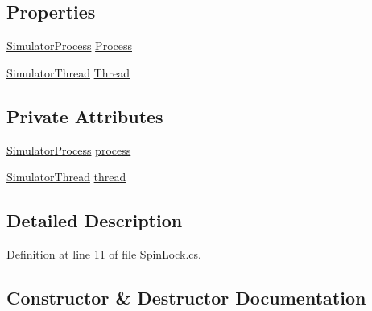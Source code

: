 \subsection*{Properties}
\begin{DoxyCompactItemize}
\item 
\hyperlink{class_c_p_u___o_s___simulator_1_1_operating___system_1_1_simulator_process}{Simulator\+Process} \hyperlink{class_c_p_u___o_s___simulator_1_1_operating___system_1_1_threading_1_1_spin_lock_a4237b6dc28a141c97ff1e03e96f11e22}{Process}
\item 
\hyperlink{class_c_p_u___o_s___simulator_1_1_operating___system_1_1_threading_1_1_simulator_thread}{Simulator\+Thread} \hyperlink{class_c_p_u___o_s___simulator_1_1_operating___system_1_1_threading_1_1_spin_lock_a1e950dc0372acfa9f7c9cd625a0f1417}{Thread}
\end{DoxyCompactItemize}
\subsection*{Private Attributes}
\begin{DoxyCompactItemize}
\item 
\hyperlink{class_c_p_u___o_s___simulator_1_1_operating___system_1_1_simulator_process}{Simulator\+Process} \hyperlink{class_c_p_u___o_s___simulator_1_1_operating___system_1_1_threading_1_1_spin_lock_a1b176f42008264daf38e29347e36ab49}{process}
\item 
\hyperlink{class_c_p_u___o_s___simulator_1_1_operating___system_1_1_threading_1_1_simulator_thread}{Simulator\+Thread} \hyperlink{class_c_p_u___o_s___simulator_1_1_operating___system_1_1_threading_1_1_spin_lock_a185fc2c9d71f3aa1ae04e4efd131f509}{thread}
\end{DoxyCompactItemize}


\subsection{Detailed Description}


Definition at line 11 of file Spin\+Lock.\+cs.



\subsection{Constructor \& Destructor Documentation}
\hypertarget{class_c_p_u___o_s___simulator_1_1_operating___system_1_1_threading_1_1_spin_lock_a894d22445c71ff22fa722077a44dc1ae}{}
